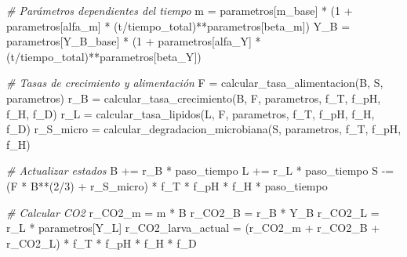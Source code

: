 \documentclass[
]{article}
\newenvironment{Shaded}{}{}
\newcommand{\CommentTok}[1]{\textcolor[rgb]{0.38,0.63,0.69}{\textit{#1}}}
\newcommand{\DecValTok}[1]{\textcolor[rgb]{0.25,0.63,0.44}{#1}}
\newcommand{\NormalTok}[1]{#1}
\newcommand{\OperatorTok}[1]{\textcolor[rgb]{0.40,0.40,0.40}{#1}}
\newcommand{\StringTok}[1]{\textcolor[rgb]{0.25,0.44,0.63}{#1}}
\begin{document}
\begin{Shaded}
\begin{Highlighting}[]
        \CommentTok{\# Parámetros dependientes del tiempo}
\NormalTok{        m }\OperatorTok{=}\NormalTok{ parametros[}\StringTok{\textquotesingle{}m\_base\textquotesingle{}}\NormalTok{] }\OperatorTok{*}\NormalTok{ (}\DecValTok{1} \OperatorTok{+}\NormalTok{ parametros[}\StringTok{\textquotesingle{}alfa\_m\textquotesingle{}}\NormalTok{] }\OperatorTok{*}\NormalTok{ (t}\OperatorTok{/}\NormalTok{tiempo\_total)}\OperatorTok{**}\NormalTok{parametros[}\StringTok{\textquotesingle{}beta\_m\textquotesingle{}}\NormalTok{])}
\NormalTok{        Y\_B }\OperatorTok{=}\NormalTok{ parametros[}\StringTok{\textquotesingle{}Y\_B\_base\textquotesingle{}}\NormalTok{] }\OperatorTok{*}\NormalTok{ (}\DecValTok{1} \OperatorTok{+}\NormalTok{ parametros[}\StringTok{\textquotesingle{}alfa\_Y\textquotesingle{}}\NormalTok{] }\OperatorTok{*}\NormalTok{ (t}\OperatorTok{/}\NormalTok{tiempo\_total)}\OperatorTok{**}\NormalTok{parametros[}\StringTok{\textquotesingle{}beta\_Y\textquotesingle{}}\NormalTok{])}
        
        \CommentTok{\# Tasas de crecimiento y alimentación}
\NormalTok{        F }\OperatorTok{=}\NormalTok{ calcular\_tasa\_alimentacion(B, S, parametros)}
\NormalTok{        r\_B }\OperatorTok{=}\NormalTok{ calcular\_tasa\_crecimiento(B, F, parametros, f\_T, f\_pH, f\_H, f\_D)}
\NormalTok{        r\_L }\OperatorTok{=}\NormalTok{ calcular\_tasa\_lipidos(L, F, parametros, f\_T, f\_pH, f\_H, f\_D)}
\NormalTok{        r\_S\_micro }\OperatorTok{=}\NormalTok{ calcular\_degradacion\_microbiana(S, parametros, f\_T, f\_pH, f\_H)}
        
        \CommentTok{\# Actualizar estados}
\NormalTok{        B }\OperatorTok{+=}\NormalTok{ r\_B }\OperatorTok{*}\NormalTok{ paso\_tiempo}
\NormalTok{        L }\OperatorTok{+=}\NormalTok{ r\_L }\OperatorTok{*}\NormalTok{ paso\_tiempo}
\NormalTok{        S }\OperatorTok{{-}=}\NormalTok{ (F }\OperatorTok{*}\NormalTok{ B}\OperatorTok{**}\NormalTok{(}\DecValTok{2}\OperatorTok{/}\DecValTok{3}\NormalTok{) }\OperatorTok{+}\NormalTok{ r\_S\_micro) }\OperatorTok{*}\NormalTok{ f\_T }\OperatorTok{*}\NormalTok{ f\_pH }\OperatorTok{*}\NormalTok{ f\_H }\OperatorTok{*}\NormalTok{ paso\_tiempo}
        
        \CommentTok{\# Calcular CO2}
\NormalTok{        r\_CO2\_m }\OperatorTok{=}\NormalTok{ m }\OperatorTok{*}\NormalTok{ B}
\NormalTok{        r\_CO2\_B }\OperatorTok{=}\NormalTok{ r\_B }\OperatorTok{*}\NormalTok{ Y\_B}
\NormalTok{        r\_CO2\_L }\OperatorTok{=}\NormalTok{ r\_L }\OperatorTok{*}\NormalTok{ parametros[}\StringTok{\textquotesingle{}Y\_L\textquotesingle{}}\NormalTok{]}
\NormalTok{        r\_CO2\_larva\_actual }\OperatorTok{=}\NormalTok{ (r\_CO2\_m }\OperatorTok{+}\NormalTok{ r\_CO2\_B }\OperatorTok{+}\NormalTok{ r\_CO2\_L) }\OperatorTok{*}\NormalTok{ f\_T }\OperatorTok{*}\NormalTok{ f\_pH }\OperatorTok{*}\NormalTok{ f\_H }\OperatorTok{*}\NormalTok{ f\_D}
        

\end{Highlighting}
\end{Shaded}
\end{document}

